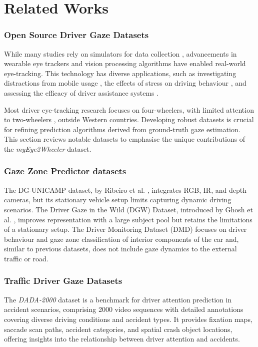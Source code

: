 \section{Related Works}
\subsubsection{Open Source Driver Gaze Datasets} 
While many studies rely on simulators for data collection \cite{fisher2007empirical8,deng2019prediction9}, advancements in wearable eye trackers and vision processing algorithms have enabled real-world eye-tracking. This technology has diverse applications, such as investigating distractions from mobile usage \cite{ojstersek2019eye10}, the effects of stress on driving behaviour \cite{wang2023eye11}, and assessing the efficacy of driver assistance systems \cite{said2018real12}.

Most driver eye-tracking research focuses on four-wheelers, with limited attention to two-wheelers \cite{distasi2011behavioral13,papakostopoulos2020semantic14,hosking2010visual15}, outside Western countries. Developing robust datasets is crucial for refining prediction algorithms derived from ground-truth gaze estimation. This section reviews notable datasets to emphasise the unique contributions of the \textit{myEye2Wheeler} dataset.
\subsubsection{Gaze Zone Predictor datasets}
The DG-UNICAMP dataset,  by Ribeiro et al. \cite{ribeiro16}, integrates RGB, IR, and depth cameras, but its stationary vehicle setup limits capturing dynamic driving scenarios.
The Driver Gaze in the Wild (DGW) Dataset, introduced by Ghosh et al. \cite{ghosh17}, improves representation with a large subject pool but retains the limitations of a stationary setup.
The Driver Monitoring Dataset (DMD) \cite{ortega18} focuses on driver behaviour and gaze zone classification of interior components of the car and, similar to previous datasets, does not include gaze dynamics to the external traffic or road.

\subsubsection{Traffic Driver Gaze Datasets}
The \textit{DADA-2000} dataset \cite{dada19} is a benchmark for driver attention prediction in accident scenarios, comprising 2000 video sequences with detailed annotations covering diverse driving conditions and accident types. It provides fixation maps, saccade scan paths, accident categories, and spatial crash object locations, offering insights into the relationship between driver attention and accidents.

